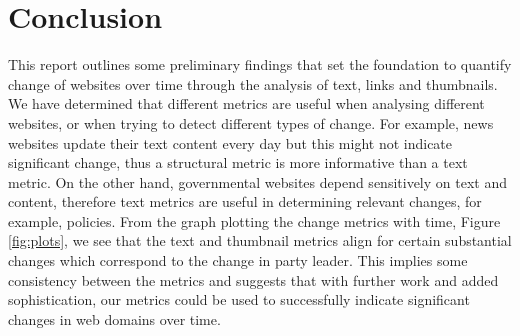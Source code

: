\documentclass[10pt, a4paper]{article}
\begin{document}
\section{Conclusion}
\vspace{-2mm}
This report outlines some preliminary findings that set the foundation to quantify change of websites over time through the analysis of text, links and thumbnails. We have determined that different metrics are useful when analysing different websites, or when trying to detect different types of change. For example, news websites update their text content every day but this might not indicate significant change, thus a structural metric is more informative than a text metric. On the other hand, governmental websites depend sensitively on text and content, therefore text metrics are useful in determining relevant changes, for example, policies. From the graph plotting the change metrics with time, Figure \ref{fig:plots}, we see that the text and thumbnail metrics align for certain substantial changes which correspond to the change in party leader. This implies some consistency between the metrics and suggests that with further work and added sophistication, our metrics could be used to successfully indicate significant changes in web domains over time.




\end{document}
